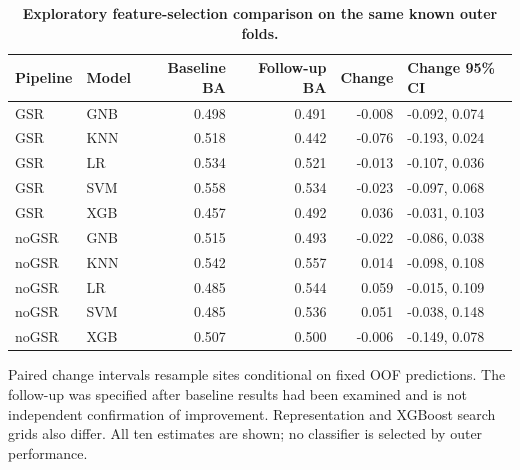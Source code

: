 \begin{table}[H]
\centering\small
\caption{\textbf{Exploratory feature-selection comparison on the same known outer folds.}}\label{tab:selection}
\begin{tabular}{llrrrl}
\toprule
Pipeline & Model & Baseline BA & Follow-up BA & Change & Change 95\% CI \\
\midrule
GSR & GNB & 0.498 & 0.491 & -0.008 & -0.092, 0.074 \\
GSR & KNN & 0.518 & 0.442 & -0.076 & -0.193, 0.024 \\
GSR & LR & 0.534 & 0.521 & -0.013 & -0.107, 0.036 \\
GSR & SVM & 0.558 & 0.534 & -0.023 & -0.097, 0.068 \\
GSR & XGB & 0.457 & 0.492 & 0.036 & -0.031, 0.103 \\
noGSR & GNB & 0.515 & 0.493 & -0.022 & -0.086, 0.038 \\
noGSR & KNN & 0.542 & 0.557 & 0.014 & -0.098, 0.108 \\
noGSR & LR & 0.485 & 0.544 & 0.059 & -0.015, 0.109 \\
noGSR & SVM & 0.485 & 0.536 & 0.051 & -0.038, 0.148 \\
noGSR & XGB & 0.507 & 0.500 & -0.006 & -0.149, 0.078 \\
\bottomrule
\end{tabular}
\begin{flushleft}\footnotesize
Paired change intervals resample sites conditional on fixed OOF predictions. The follow-up was specified after baseline results had been examined and is not independent confirmation of improvement. Representation and XGBoost search grids also differ. All ten estimates are shown; no classifier is selected by outer performance.
\end{flushleft}
\end{table}
